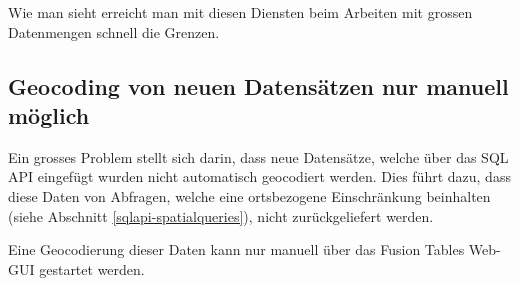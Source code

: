 Wie man sieht erreicht man mit diesen Diensten beim Arbeiten mit grossen Datenmengen schnell die Grenzen.

\subsection{Geocoding von neuen Datensätzen nur manuell möglich}
\label{geocodierung-bug}
Ein grosses Problem stellt sich darin, dass neue Datensätze, welche über das SQL \gls{API}  eingefügt wurden nicht automatisch geocodiert werden. Dies führt dazu, dass diese Daten von Abfragen, welche eine ortsbezogene Einschränkung beinhalten (siehe Abschnitt \ref{sqlapi-spatialqueries}), nicht zurückgeliefert werden.

Eine \gls{Geocodierung} dieser Daten kann nur manuell über das Fusion Tables Web-GUI gestartet werden.
